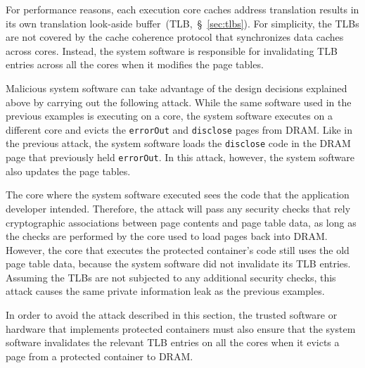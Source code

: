 For performance reasons, each execution core caches address translation results
in its own translation look-aside buffer~(TLB,~\S~\ref{sec:tlbs}). For
simplicity, the TLBs are not covered by the cache coherence protocol that
synchronizes data caches across cores. Instead, the system software is
responsible for invalidating TLB entries across all the cores when it modifies
the page tables.

Malicious system software can take advantage of the design decisions explained
above by carrying out the following attack. While the same software used in the
previous examples is executing on a core, the system software executes on a
different core and evicts the \texttt{errorOut} and \texttt{disclose} pages
from DRAM. Like in the previous attack, the system software loads the
\texttt{disclose} code in the DRAM page that previously held \texttt{errorOut}.
In this attack, however, the system software also updates the page tables.

The core where the system software executed sees the code that the application
developer intended. Therefore, the attack will pass any security checks that
rely cryptographic associations between page contents and page table data, as
long as the checks are performed by the core used to load pages back into DRAM.
However, the core that executes the protected container's code still uses the
old page table data, because the system software did not invalidate its TLB
entries. Assuming the TLBs are not subjected to any additional security checks,
this attack causes the same private information leak as the previous examples.

In order to avoid the attack described in this section, the trusted software or
hardware that implements protected containers must also ensure that the system
software invalidates the relevant TLB entries on all the cores when it evicts a
page from a protected container to DRAM.
